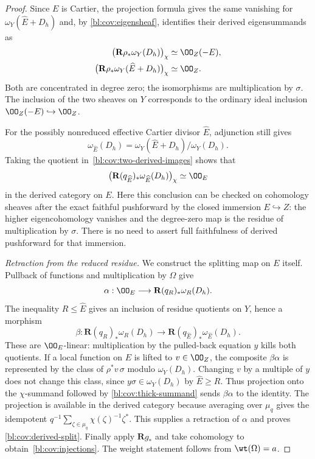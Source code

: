 \begin{proof}
Since $E$ is Cartier, the projection formula gives the same vanishing
for $\omega_Y(\widehat E+D_h)$ and, by
\eqref{bl:cov:eigensheaf}, identifies their derived eigensummands as
\begin{equation}\label{bl:cov:two-derived-images}
 \begin{split}
 \bigl(\mathbf R\rho_*\omega_Y(D_h)\bigr)_\chi
     &\simeq\OO_Z(-E),\\
 \bigl(\mathbf R\rho_*\omega_Y(\widehat E+D_h)\bigr)_\chi
     &\simeq\OO_Z.
 \end{split}
\end{equation}
Both are concentrated in degree zero; the isomorphisms are
multiplication by $\sigma$.  The inclusion of the two sheaves on $Y$
corresponds to the ordinary ideal inclusion $\OO_Z(-E)\hookrightarrow
\OO_Z$.

For the possibly nonreduced effective Cartier divisor $\widehat E$,
adjunction still gives
\[
 \omega_{\widehat E}(D_h)
   =\omega_Y(\widehat E+D_h)/\omega_Y(D_h).
\]
Taking the quotient in~\eqref{bl:cov:two-derived-images} shows that
\begin{equation}\label{bl:cov:thick-summand}
 \bigl(\mathbf R(q_{\widehat E})_*
                 \omega_{\widehat E}(D_h)\bigr)_\chi
       \simeq\OO_E
\end{equation}
in the derived category on $E$.  Here this conclusion can be checked
on cohomology sheaves after the exact faithful pushforward by the
closed immersion $E\hookrightarrow Z$: the higher eigencohomology
vanishes and the degree-zero map is the residue of multiplication by
$\sigma$.  There is no need to assert full faithfulness of derived
pushforward for that immersion.

\smallskip\noindent
\emph{Retraction from the reduced residue.}
We construct the splitting map on $E$ itself.
Pullback of functions and multiplication by $\Omega$ give
\[
 \alpha:\OO_E\longrightarrow\mathbf R(q_R)_*\omega_R(D_h).
\]
The inequality $R\leq\widehat E$ gives an inclusion of residue
quotients on $Y$, hence a morphism
\[
 \beta:\mathbf R(q_R)_*\omega_R(D_h)
       \longrightarrow\mathbf R(q_{\widehat E})_*
                                      \omega_{\widehat E}(D_h).
\]
These are $\OO_E$-linear: multiplication by the pulled-back equation
$y$ kills both quotients.  If a local function on $E$ is lifted to
$v\in\OO_Z$, the composite $\beta\alpha$ is represented by the
class of $\rho^*v\,\sigma$ modulo $\omega_Y(D_h)$.
Changing $v$ by a multiple of $y$ does not change this class, since
$y\sigma\in\omega_Y(D_h)$ by $\widehat E\geq R$.
Thus projection onto the $\chi$-summand followed by
\eqref{bl:cov:thick-summand} sends $\beta\alpha$ to the identity.
The projection is available in the derived category because
averaging over $\mu_q$ gives the idempotent
$q^{-1}\sum_{\zeta\in\mu_q}\chi(\zeta)^{-1}\zeta^*$.
This supplies a retraction of $\alpha$ and proves
\eqref{bl:cov:derived-split}.  Finally apply $\mathbf Rg_*$ and take
cohomology to obtain~\eqref{bl:cov:injections}.  The weight statement
follows from $\wt(\Omega)=a$.
\end{proof}

